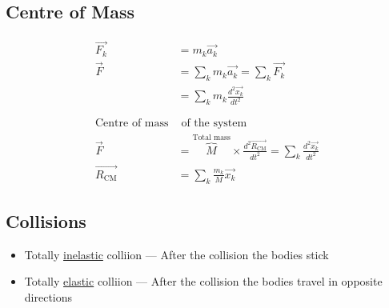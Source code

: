 \documentclass[12pt]{article}
\begin{document}
\subsection{Centre of Mass}
\begin{align*}
	\overrightarrow{F_k}         & = m_k \overrightarrow{a_k}                                                                                                            \\
	\overrightarrow{F}           & = \sum_k m_k \overrightarrow{a_k} = \sum_k \overrightarrow{F_k}                                                                       \\
	                             & = \sum_k m_k \frac{d^2 \overrightarrow{x_k}}{dt^2}                                                                                    \\
	\phantom{=}                                                                                                                                                          \\
	\text{Centre of mass}        & \text{ of the system}                                                                                                                 \\
	\overrightarrow{F}           & = \overbrace{M}^\text{Total mass} \times \frac{d^2 \overrightarrow{R_\text{CM}}}{dt^2} = \sum_k \frac{d^2 \overrightarrow{x_k}}{dt^2} \\
	\overrightarrow{R_\text{CM}} & = \sum_k \frac{m_k}{M} \overrightarrow{x_k}
\end{align*}

\subsection{Collisions}
\begin{itemize}
	\item{Totally \underline{inelastic} colliion --- After the collision the bodies stick}
	\item{Totally \underline{elastic} colliion --- After the collision the bodies travel in opposite directions}
\end{itemize}
\end{document}
